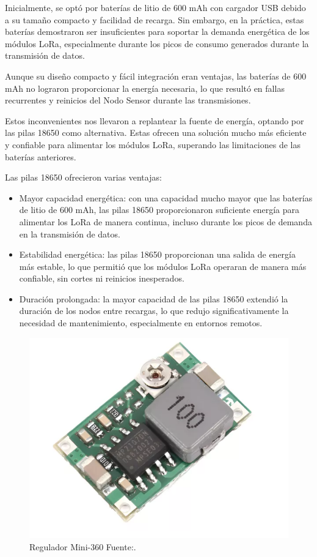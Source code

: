 Inicialmente, se optó por baterías de litio de 600 mAh con cargador USB debido a su tamaño compacto y facilidad de recarga. Sin embargo, en la práctica, estas baterías demostraron ser insuficientes para soportar la demanda energética de los módulos LoRa, especialmente durante los picos de consumo generados durante la transmisión de datos.

Aunque su diseño compacto y fácil integración eran ventajas, las baterías de 600 mAh no lograron proporcionar la energía necesaria, lo que resultó en fallas recurrentes y reinicios del Nodo Sensor durante las transmisiones.

Estos inconvenientes nos llevaron a replantear la fuente de energía, optando por las pilas 18650 como alternativa. Estas ofrecen una solución mucho más eficiente y confiable para alimentar los módulos LoRa, superando las limitaciones de las baterías anteriores. 

Las pilas 18650 ofrecieron varias ventajas:

\begin{itemize}
    \item Mayor capacidad energética: con una capacidad mucho mayor que las baterías de litio de 600 mAh, las pilas 18650 proporcionaron suficiente energía para alimentar los LoRa de manera continua, incluso durante los picos de demanda en la transmisión de datos.
    
    \item Estabilidad energética: las pilas 18650 proporcionan una salida de energía más estable, lo que permitió que los módulos LoRa operaran de manera más confiable, sin cortes ni reinicios inesperados.
    
    \item Duración prolongada: la mayor capacidad de las pilas 18650 extendió la duración de los nodos entre recargas, lo que redujo significativamente la necesidad de mantenimiento, especialmente en entornos remotos.
\end{itemize}

\begin{figure}[H]
	\centering
	\includegraphics[scale=0.6]{./Figures/Hardware/Alimentacion/mini360.png}
	\caption{Regulador Mini-360 Fuente:\cite{MINI360}.}
	\label{fig:mini360}
\end{figure}

